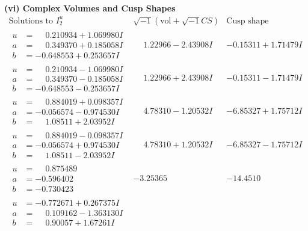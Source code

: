 \documentclass[1p]{elsarticle_modified}
\theoremstyle{definition}
\newcommand{\I}{\sqrt{-1}}
\begin{document}
\newpage\flushleft \textbf{(vi) Complex Volumes and Cusp Shapes}
$$\begin{array}{c|c|c}  
\text{Solutions to }I^u_{2}& \I (\text{vol} + \sqrt{-1}CS) & \text{Cusp shape}\\
 \hline 
\begin{aligned}
u &= \phantom{-}0.210934 + 1.069980 I \\
a &= \phantom{-}0.349370 + 0.185058 I \\
b &= -0.648553 + 0.253657 I\end{aligned}
 & \phantom{-}1.22966 - 2.43908 I & -0.15311 + 1.71479 I \\ \hline\begin{aligned}
u &= \phantom{-}0.210934 - 1.069980 I \\
a &= \phantom{-}0.349370 - 0.185058 I \\
b &= -0.648553 - 0.253657 I\end{aligned}
 & \phantom{-}1.22966 + 2.43908 I & -0.15311 - 1.71479 I \\ \hline\begin{aligned}
u &= \phantom{-}0.884019 + 0.098357 I \\
a &= -0.056574 - 0.974530 I \\
b &= \phantom{-}1.08511 + 2.03952 I\end{aligned}
 & \phantom{-}4.78310 - 1.20532 I & -6.85327 + 1.75712 I \\ \hline\begin{aligned}
u &= \phantom{-}0.884019 - 0.098357 I \\
a &= -0.056574 + 0.974530 I \\
b &= \phantom{-}1.08511 - 2.03952 I\end{aligned}
 & \phantom{-}4.78310 + 1.20532 I & -6.85327 - 1.75712 I \\ \hline\begin{aligned}
u &= \phantom{-}0.875489\phantom{ +0.000000I} \\
a &= -0.596402\phantom{ +0.000000I} \\
b &= -0.730423\phantom{ +0.000000I}\end{aligned}
 & -3.25365\phantom{ +0.000000I} & -14.4510\phantom{ +0.000000I} \\ \hline\begin{aligned}
u &= -0.772671 + 0.267375 I \\
a &= \phantom{-}0.109162 - 1.363130 I \\
b &= \phantom{-}0.90057 + 1.67261 I\end{aligned}

\end{array}$$
\end{document}
